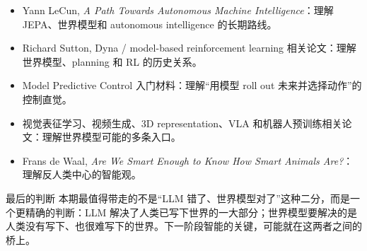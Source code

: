 \documentclass[a4paper]{article}
\begin{document}
\begin{itemize}
\item Yann LeCun, \textit{A Path Towards Autonomous Machine Intelligence}：理解 JEPA、世界模型和 autonomous intelligence 的长期路线。
\item Richard Sutton, Dyna / model-based reinforcement learning 相关论文：理解世界模型、planning 和 RL 的历史关系。
\item Model Predictive Control 入门材料：理解“用模型 roll out 未来并选择动作”的控制直觉。
\item 视觉表征学习、视频生成、3D representation、VLA 和机器人预训练相关论文：理解世界模型可能的多条入口。
\item Frans de Waal, \textit{Are We Smart Enough to Know How Smart Animals Are?}：理解反人类中心的智能观。
\end{itemize}

\begin{importantbox}{最后的判断}
本期最值得带走的不是“LLM 错了、世界模型对了”这种二分，而是一个更精确的判断：LLM 解决了人类已写下世界的一大部分；世界模型要解决的是人类没有写下、也很难写下的世界。下一阶段智能的关键，可能就在这两者之间的桥上。
\end{importantbox}
\end{document}
